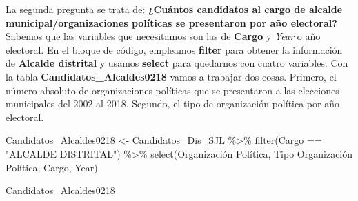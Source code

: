 \documentclass[
]{book}
\newenvironment{Shaded}{\begin{snugshade}}{\end{snugshade}}
\newcommand{\AttributeTok}[1]{\textcolor[rgb]{0.77,0.63,0.00}{#1}}
\newcommand{\FunctionTok}[1]{\textcolor[rgb]{0.00,0.00,0.00}{#1}}
\newcommand{\NormalTok}[1]{#1}
\newcommand{\OtherTok}[1]{\textcolor[rgb]{0.56,0.35,0.01}{#1}}
\newcommand{\SpecialCharTok}[1]{\textcolor[rgb]{0.00,0.00,0.00}{#1}}
\newcommand{\StringTok}[1]{\textcolor[rgb]{0.31,0.60,0.02}{#1}}
\begin{document}
La segunda pregunta se trata de: \textbf{¿Cuántos candidatos al cargo de alcalde municipal/organizaciones políticas se presentaron por año electoral?} Sabemos que las variables que necesitamos son las de \textbf{Cargo} y \emph{Year} o año electoral. En el bloque de código, empleamos \textbf{filter} para obtener la información de \textbf{Alcalde distrital} y usamos \textbf{select} para quedarnos con cuatro variables. Con la tabla \textbf{Candidatos\_Alcaldes0218} vamos a trabajar dos cosas. Primero, el número absoluto de organizaciones políticas que se presentaron a las elecciones municipales del 2002 al 2018. Segundo, el tipo de organización política por año electoral.

\begin{Shaded}
\begin{Highlighting}[]
\NormalTok{Candidatos\_Alcaldes0218 }\OtherTok{\textless{}{-}}\NormalTok{ Candidatos\_Dis\_SJL }\SpecialCharTok{\%\textgreater{}\%} 
  \FunctionTok{filter}\NormalTok{(Cargo }\SpecialCharTok{==} \StringTok{"ALCALDE DISTRITAL"}\NormalTok{) }\SpecialCharTok{\%\textgreater{}\%} 
  \FunctionTok{select}\NormalTok{(}\StringTok{\textasciigrave{}}\AttributeTok{Organización Política}\StringTok{\textasciigrave{}}\NormalTok{, }\StringTok{\textasciigrave{}}\AttributeTok{Tipo Organización Política}\StringTok{\textasciigrave{}}\NormalTok{, Cargo, Year) }
\end{Highlighting}
\end{Shaded}

\begin{Shaded}
\begin{Highlighting}[]
\NormalTok{Candidatos\_Alcaldes0218}
\end{Highlighting}
\end{Shaded}
\end{document}
